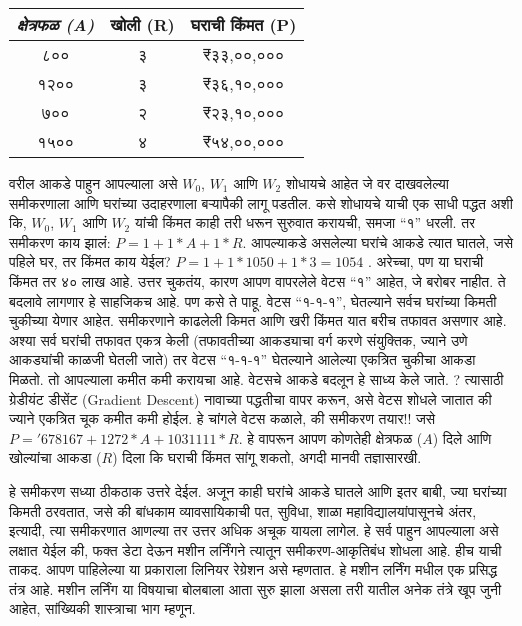 \begin{table}[h!]
\centering
\begin{tabular}{|c|c|c|}
\hline
\textit{क्षेत्रफळ (A)} & \textbf{खोली (R)} & \textbf{घराची किंमत (P)} \\
\hline
८०० & ३ & ₹३३,००,००० \\
१२०० & ३ & ₹३६,१०,००० \\
७०० & २ & ₹२३,१०,००० \\
१५०० & ४ & ₹५४,००,००० \\
\hline
\end{tabular}
\end{table}


वरील आकडे पाहुन आपल्याला असे $W_0$, $W_1$ आणि $W_2$ शोधायचे आहेत जे वर दाखवलेल्या समीकरणाला आणि घरांच्या उदाहरणाला बऱ्यापैकी लागू पडतील. कसे शोधायचे याची एक साधी पद्धत अशी कि, $W_0$, $W_1$ आणि $W_2$ यांची किंमत काही तरी धरून सुरुवात करायची, समजा ``१'' धरली. तर समीकरण काय झालं: $P = 1+ 1 *A + 1 *R$. आपल्याकडे असलेल्या घरांचे आकडे त्यात घातले, जसे पहिले घर, तर किंमत काय येईल? $P = 1+ 1 * 1050 + 1*3 = 1054$ . अरेच्चा, पण या घराची किंमत तर ४० लाख आहे. उत्तर चुकतंय, कारण आपण वापरलेले वेटस ``१'' आहेत, जे बरोबर नाहीत. ते बदलावे लागणार हे साहजिकच आहे. पण कसे ते पाहू. वेटस ``१-१-१'', घेतल्याने सर्वच घरांच्या किमती चुकीच्या येणार आहेत. समीकरणाने काढलेली किमत आणि खरी किंमत यात बरीच तफावत असणार आहे. अश्या सर्व घरांची तफावत एकत्र केली (तफावतीच्या आकड्याचा वर्ग करणे संयुक्तिक, ज्याने उणे आकड्यांची काळजी घेतली जाते) तर वेटस ``१-१-१'' घेतल्याने आलेल्या एकत्रित चुकीचा आकडा मिळतो. तो आपल्याला कमीत कमी करायचा आहे. वेटसचे आकडे बदलून हे साध्य केले जाते. ? त्यासाठी ग्रेडीयंट डीसेंट (Gradient Descent) नावाच्या पद्धतीचा वापर करून, असे वेटस शोधले जातात की ज्याने एकत्रित चूक कमीत कमी होईल. हे चांगले वेटस कळाले, की समीकरण तयार!! जसे $P = '678167 + 1272 * A + 1031111 * R$. हे वापरून आपण कोणतेही क्षेत्रफळ ($A$) दिले आणि खोल्यांचा आकडा ($R$) दिला कि घराची किंमत सांगू शकतो, अगदी मानवी तज्ञासारखी.

हे समीकरण सध्या ठीकठाक उत्तरे देईल. अजून काही घरांचे आकडे  घातले  आणि इतर बाबी, ज्या घरांच्या किमती ठरवतात, जसे की बांधकाम व्यावसायिकाची पत, सुविधा, शाळा महाविद्यालयांपासूनचे अंतर, इत्यादी, त्या समीकरणात आणल्या तर उत्तर अधिक अचूक यायला लागेल. हे सर्व पाहुन आपल्याला असे लक्षात येईल की, फक्त डेटा देऊन मशीन लर्निंगने त्यातून समीकरण-आकृतिबंध शोधला आहे. हीच याची ताकद. आपण पाहिलेल्या या प्रकाराला लिनियर रेग्रेशन असे म्हणतात. हे मशीन लर्निंग मधील एक प्रसिद्ध तंत्र आहे. मशीन लर्निंग या विषयाचा बोलबाला आता सुरु झाला असला तरी यातील अनेक तंत्रे खूप जुनी आहेत, सांख्यिकी शास्त्राचा भाग म्हणून.

